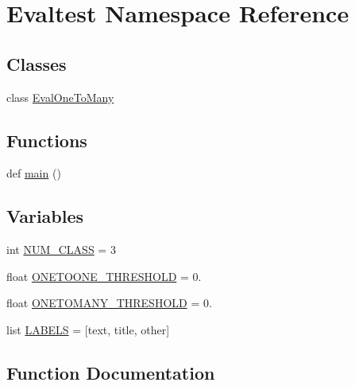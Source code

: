 \hypertarget{namespace_evaltest}{}\section{Evaltest Namespace Reference}
\label{namespace_evaltest}
\subsection*{Classes}
\begin{DoxyCompactItemize}
\item 
class \hyperlink{class_evaltest_1_1_eval_one_to_many}{Eval\+One\+To\+Many}
\end{DoxyCompactItemize}
\subsection*{Functions}
\begin{DoxyCompactItemize}
\item 
def \hyperlink{namespace_evaltest_a7e03458fbecad97ddc570f644c981919}{main} ()
\end{DoxyCompactItemize}
\subsection*{Variables}
\begin{DoxyCompactItemize}
\item 
int \hyperlink{namespace_evaltest_aa4d0b79cb7ae7c4c841a29456cc0067a}{N\+U\+M\+\_\+\+C\+L\+A\+S\+S} = 3
\item 
float \hyperlink{namespace_evaltest_af7e6e5c9b1bd9a89a99df70b11f5ed8a}{O\+N\+E\+T\+O\+O\+N\+E\+\_\+\+T\+H\+R\+E\+S\+H\+O\+L\+D} = 0.
\item 
float \hyperlink{namespace_evaltest_a7e4ed2a9bc415391c5448564194f0af3}{O\+N\+E\+T\+O\+M\+A\+N\+Y\+\_\+\+T\+H\+R\+E\+S\+H\+O\+L\+D} = 0.
\item 
list \hyperlink{namespace_evaltest_aa5bf88ef646f92ec2ceb3e24fb21c1ad}{L\+A\+B\+E\+L\+S} = \mbox{[}\textquotesingle{}text\textquotesingle{}, \textquotesingle{}title\textquotesingle{}, \textquotesingle{}other\textquotesingle{}\mbox{]}
\end{DoxyCompactItemize}


\subsection{Function Documentation}
\hypertarget{namespace_evaltest_a7e03458fbecad97ddc570f644c981919}{}
